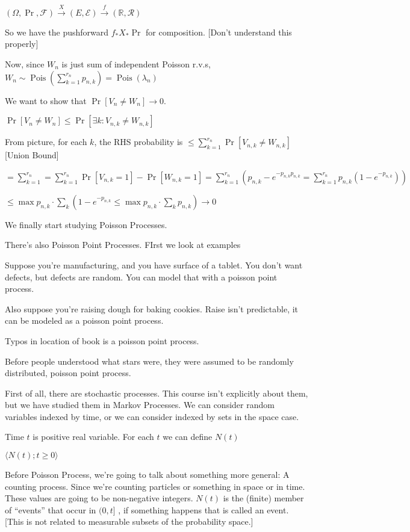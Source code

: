 \documentclass{article}
\theoremstyle{definition}
\newcommand{\Pois}{\operatorname{Pois}}
\begin{document}
\((\Omega,\Pr,\mathcal{F} )\overset{X}{\to } (E,\mathcal{E})\overset{f}{\to }(\mathbb{R} ,\mathcal{R} ) \) 

So we have the pushforward \(f_{\ast} X_{\ast} \Pr\) for composition. [Don't understand this properly]

Now, since \(W_{n} \) is just sum of independent Poisson r.v.s, \(W_{n} \sim \Pois(\sum_{k=1}^{r_{n} } p_{n,k} )=\Pois(\lambda _{n})\) 

We want to show that \(\Pr[V_{n} \neq W_{n} ] \to 0\).

\(\Pr[V_{n} \neq W_{n} ] \leq \Pr[\exists k:V_{n,k}\neq W_{n,k}]\) 

From picture, for each \(k\), the RHS probability is \(\leq \sum_{k=1}^{r_{n} } \Pr[V_{n,k}\neq W_{n,k}]\)  [Union Bound]

\(=\sum_{k=1}^{r_{n} } =\sum_{k=1}^{r_{n} } \Pr[V_{n,k}=1]-\Pr[W_{n,k}=1]=\sum_{k=1}^{r_{n} } (p_{n,k}-e^{-p_{n,k}p_{n,k}}=\sum_{k=1}^{r_{n} } p_{n,k}(1-e^{-p_{n,k}}))\)

\( \leq \max p_{n,k}\cdot \sum_{k} (1-e^{-p_{n,k}} \leq \max p_{n,k}\cdot \sum_{k} p_{n,k}) \to 0 \) 

We finally start studying Poisson Processes.

There's also Poisson Point Processes. FIrst we look at examples

Suppose you're manufacturing, and you have surface of a tablet. You don't want defects, but defects are random. You can model that with a poisson point process.

Also suppose you're raising dough for baking cookies. Raise isn't predictable, it can be modeled as a poisson point process.

Typos in location of book is a poisson point process.

Before people understood what stars were, they were assumed to be randomly distributed, poisson point process.

First of all, there are stochastic processes. This course isn't explicitly about them, but we have studied them in Markov Processes. We can consider random variables indexed by time, or we can consider indexed by sets in the space case.

Time \(t\) is positive real variable. For each \(t\) we can define \(N(t)\)

\(\langle N(t) ; t\geq 0 \rangle \) 

Before Poisson Process, we're going to talk about something more general: A counting process. Since we're counting particles or something in space or in time. These values are going to be non-negative integers. \(N(t)\) is the (finite) member of ``events'' that occur in \((0,t]\) , if something happens that is called an event. [This is not related to measurable subsets of the probability space.]
\end{document}

